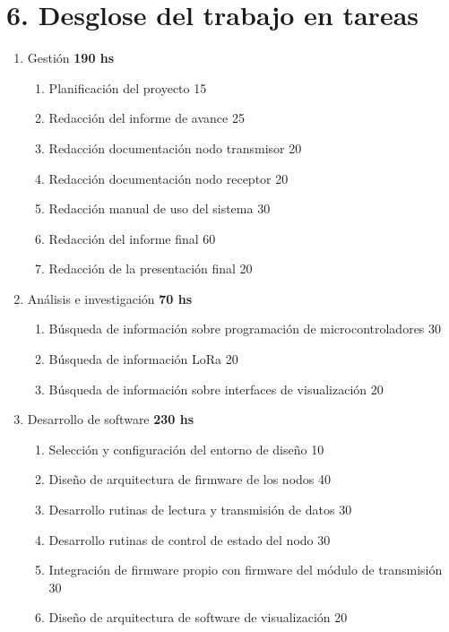 \documentclass[11pt]{charter}
\begin{document}
\newpage

\section{6. Desglose del trabajo en tareas}
\label{sec:wbs}
\begin{enumerate}
\item Gestión 																	\hfill \textbf{190 hs}
	\begin{enumerate}
	\item Planificación del proyecto 											\hfill 15
	\item Redacción del informe de avance 										\hfill 25
	\item Redacción documentación nodo transmisor 								\hfill 20
	\item Redacción documentación nodo receptor									\hfill 20
	\item Redacción manual de uso del sistema									\hfill 30
	\item Redacción del informe final 											\hfill 60
	\item Redacción de la presentación final									\hfill 20
	\end{enumerate}
\item Análisis e investigación													\hfill \textbf{70 hs}
	\begin{enumerate}
	\item Búsqueda de información sobre programación de microcontroladores		\hfill 30
	\item Búsqueda de información LoRa											\hfill 20
	\item Búsqueda de información sobre interfaces de visualización				\hfill 20	
	\end{enumerate}
\item Desarrollo de software													\hfill \textbf{230 hs}
	\begin{enumerate}
	\item Selección y configuración del entorno de diseño						\hfill 10
	\item Diseño de arquitectura de firmware de los nodos						\hfill 40
	\item Desarrollo rutinas de lectura y transmisión de datos					\hfill 30
	\item Desarrollo rutinas de control de estado del nodo						\hfill 30
	\item Integración de firmware propio con firmware del módulo de transmisión	\hfill 30
	\item Diseño de arquitectura de software de visualización					\hfill 20

\end{enumerate}
\end{enumerate}
\end{document}
